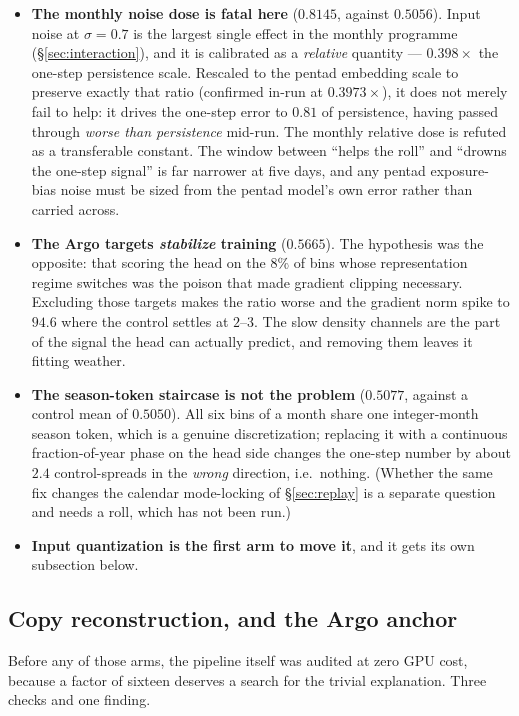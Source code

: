 \documentclass[10pt]{article}
\begin{document}
\begin{itemize}\itemsep3pt
\item \textbf{The monthly noise dose is fatal here} ($0.8145$, against
  $0.5056$). Input noise at $\sigma=0.7$ is the largest single effect in the
  monthly programme (\S\ref{sec:interaction}), and it is calibrated as a
  \emph{relative} quantity --- $0.398\times$ the one-step persistence
  scale. Rescaled to the pentad embedding scale to preserve exactly that
  ratio (confirmed in-run at $0.3973\times$), it does not merely fail to
  help: it drives the one-step error to $0.81$ of persistence, having passed
  through \emph{worse than persistence} mid-run. The monthly relative dose
  is refuted as a transferable constant. The window between ``helps the
  roll'' and ``drowns the one-step signal'' is far narrower at five days,
  and any pentad exposure-bias noise must be sized from the pentad model's
  own error rather than carried across.
\item \textbf{The Argo targets \emph{stabilize} training} ($0.5665$).
  The hypothesis was the opposite: that scoring the head on the $8\%$ of
  bins whose representation regime switches was the poison that made
  gradient clipping necessary. Excluding those targets makes the ratio
  worse and the gradient norm spike to $94.6$ where the control settles at
  $2$--$3$. The slow density channels are the part of the signal the head
  can actually predict, and removing them leaves it fitting weather.
\item \textbf{The season-token staircase is not the problem} ($0.5077$,
  against a control mean of $0.5050$). All six bins of a month share one
  integer-month season token, which is a genuine discretization; replacing
  it with a continuous fraction-of-year phase on the head side changes the
  one-step number by about $2.4$ control-spreads in the \emph{wrong}
  direction, i.e.\ nothing. (Whether the same fix changes the calendar
  mode-locking of \S\ref{sec:replay} is a separate question and needs a
  roll, which has not been run.)
\item \textbf{Input quantization is the first arm to move it}, and it gets
  its own subsection below.
\end{itemize}

\subsection{Copy reconstruction, and the Argo
anchor}\label{sec:recon}

Before any of those arms, the pipeline itself was audited at zero GPU cost,
because a factor of sixteen deserves a search for the trivial explanation.
Three checks and one finding.
\end{document}

